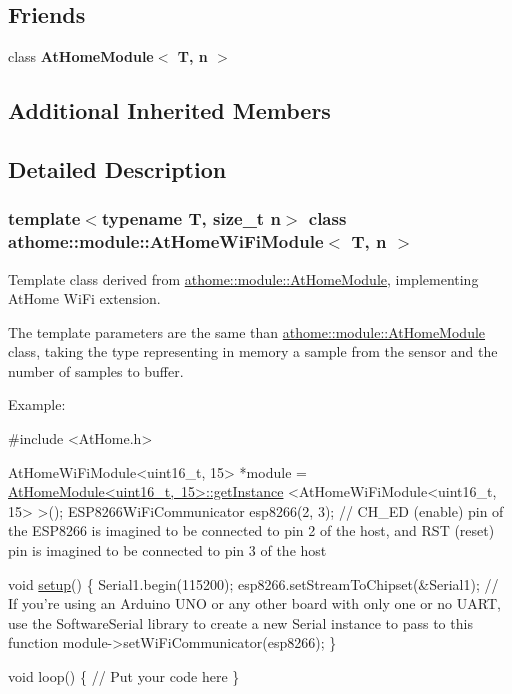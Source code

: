 \subsection*{Friends}
\begin{DoxyCompactItemize}
\item 
\mbox{\label{classathome_1_1module_1_1_at_home_wi_fi_module_a5db9640f2e295c39a19645b0d682d7d5}} 
class {\bfseries At\+Home\+Module$<$ T, n $>$}
\end{DoxyCompactItemize}
\subsection*{Additional Inherited Members}


\subsection{Detailed Description}
\subsubsection*{template$<$typename T, size\+\_\+t n$>$\newline
class athome\+::module\+::\+At\+Home\+Wi\+Fi\+Module$<$ T, n $>$}

Template class derived from \mbox{\hyperlink{classathome_1_1module_1_1_at_home_module}{athome\+::module\+::\+At\+Home\+Module}}, implementing At\+Home Wi\+Fi extension.

The template parameters are the same than \mbox{\hyperlink{classathome_1_1module_1_1_at_home_module}{athome\+::module\+::\+At\+Home\+Module}} class, taking the type representing in memory a sample from the sensor and the number of samples to buffer.

Example\+:


\begin{DoxyCode}
\textcolor{preprocessor}{#include <AtHome.h>}

AtHomeWiFiModule<uint16\_t, 15> *module = \mbox{\hyperlink{classathome_1_1module_1_1_at_home_module_acc6e7fc0d86f11648fd81729484e546f}{AtHomeModule<uint16\_t, 15>::getInstance}}
      <AtHomeWiFiModule<uint16\_t, 15> >();
ESP8266WiFiCommunicator esp8266(2, 3); \textcolor{comment}{// CH\_ED (enable) pin of the ESP8266 is imagined to be connected to
       pin 2 of the host, and RST (reset) pin is imagined to be connected to pin 3 of the host}

\textcolor{keywordtype}{void} \mbox{\hyperlink{classathome_1_1module_1_1_at_home_module_a5354c736954a788c51e7cf25f6ccf89d}{setup}}() \{
  Serial1.begin(115200);
  esp8266.setStreamToChipset(&Serial1); \textcolor{comment}{// If you're using an Arduino UNO or any other board with only one
       or no UART, use the SoftwareSerial library to create a new Serial instance to pass to this function}
  module->setWiFiCommunicator(esp8266);
\}

\textcolor{keywordtype}{void} loop() \{
  \textcolor{comment}{// Put your code here}
\}
\end{DoxyCode}
 

